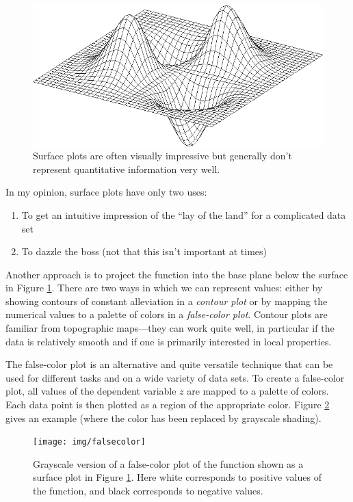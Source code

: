 \begin{figure}
    \centerline{\includegraphics{img/surface}}
  \caption{Surface plots are often visually impressive but generally
    don't represent quantitative information very well.}
  \label{fig:surface}
\end{figure}

In my opinion, surface plots have only two uses:
\begin{enumerate}
\item To get an intuitive impression of the ``lay of the land'' for
  a complicated data set
\item To dazzle the boss (not that this isn't important at times)\vfill\pagebreak
\end{enumerate}

Another approach is to project the function into the base plane below
the surface in Figure \ref{fig:surface}. There are two ways in which
we can represent values: either by showing contours of constant
alleviation in a \emph{contour plot}  or by mapping the numerical
values to a palette of colors in a \emph{false-color plot}. Contour
plots are familiar from topographic maps---they can work quite well,
in particular if the data is relatively smooth and if one is primarily
interested in local properties.

The false-color plot is an alternative and quite versatile technique
that can be used for different tasks and on a wide variety of data
sets. To create a false-color plot, all values of the dependent
variable $z$ are mapped to a palette of colors. Each data point is
then plotted as a region of the appropriate color. Figure
\ref{fig:grayscale} gives an example (where the color has been
replaced by grayscale shading).

\begin{figure}
   \centerline{\texttt{[image: img/falsecolor]}}
  \caption{Grayscale version of a false-color plot of the function
    shown as a surface plot in Figure \ref{fig:surface}.  Here white
    corresponds to positive values of the function, and black
    corresponds to negative values.}
  \label{fig:grayscale}
\end{figure}\pagebreak

